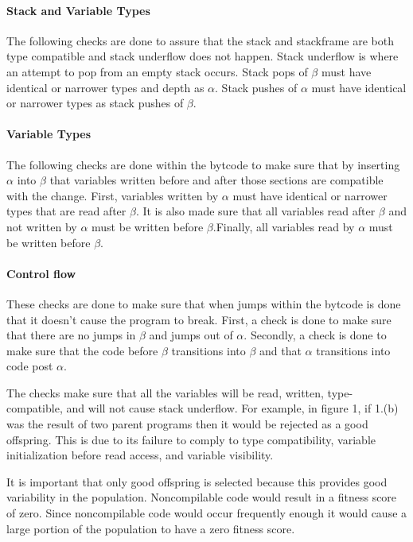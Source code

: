 \documentclass{sig-alternate}
\begin{document}
\paragraph{Stack and Variable Types}
The following checks are done to assure that the stack and stackframe are both type compatible and stack underflow does not happen. Stack underflow is where an attempt to pop from an empty stack occurs. Stack pops of $\beta$ must have identical or narrower types and depth as $\alpha$. Stack pushes of $\alpha$ must have identical or narrower types as stack pushes of $\beta$.

\paragraph{Variable Types}
The following checks are done within the bytcode to make sure that by inserting $\alpha$ into $\beta$ that variables written before and after those sections are compatible with the change. 
First, variables written by $\alpha$ must have identical or narrower types that are read after $\beta$. It is also made sure that all variables read after $\beta$ and not written by $\alpha$ must be written before $\beta$.Finally, all variables read by $\alpha$ must be written before $\beta$.

\paragraph{Control flow}
These checks are done to make sure that when jumps within the bytcode is done that it doesn't cause the program to break. First, a check is done to make sure that there are no jumps in $\beta$ and jumps out of $\alpha$. Secondly, a check is done to make sure that the code before $\beta$ transitions into $\beta$ and that $\alpha$ transitions into code post $\alpha$.  


The checks make sure that all the variables will be read, written, type-compatible, and will not cause stack underflow\cite{VIII:2011}. For example, in figure 1, if 1.(b) was the result of two parent programs then it would be rejected as a good offspring. This is due to its failure to comply to type compatibility, variable initialization before read access, and variable visibility.\par
It is important that only good offspring is selected because this provides good variability in the population. Noncompilable code would result in a fitness score of zero. Since noncompilable code would occur frequently enough it would cause a large portion of the population to have a zero fitness score.
\end{document}
